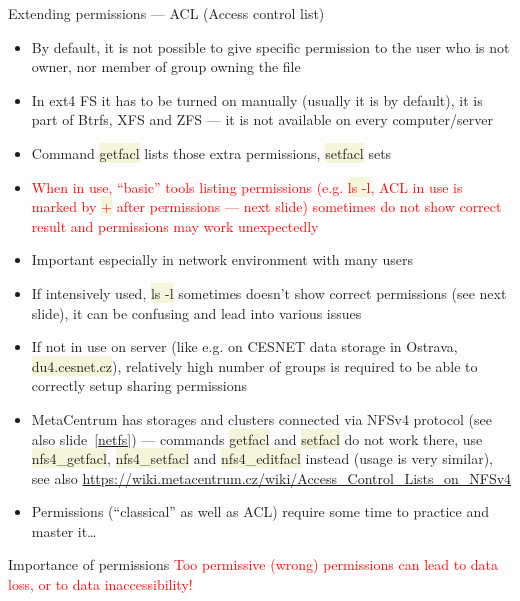 \documentclass[compress, xelatex, 11pt, xcolor=svgnames, aspectratio=169,
	hyperref={
		bookmarks=true,
		unicode=true,
		colorlinks=true,
		pdftitle={Linux, command line and MetaCentrum},
		plainpages=false,
		pdfauthor={Vojtech Zeisek},
		pdfsubject={Course about use of Linux command line, writing shell scripts and using MetaCentrum of CESNET},
		pdfcreator={XeLaTeX},
		pdfkeywords={Linux, GNU, BASH, shell, command line, MetaCentrum},
		linkcolor=DarkRed, %
		anchorcolor=DarkBlue, %
		citecolor=Indigo, %
		filecolor=NavyBlue, %
		menucolor=DarkMagenta, %
		urlcolor=DarkBlue, %
		},
	url={hyphens, lowtilde} %
	]{beamer}
\renewcommand{\texttt}[1]{\colorbox{Beige}{{\ttfamily #1}}}
\renewcommand{\alert}[1]{\textcolor{red}{#1}}
\begin{document}
\begin{frame}[allowframebreaks]{Extending permissions --- ACL (Access control list)}
	\label{acl}
	\begin{itemize}
		\item By default, it is not possible to give specific permission to the user who is not owner, nor member of group owning the file
		\item In ext4 FS it has to be turned on manually (usually it is by default), it is part of Btrfs, XFS and ZFS --- it is not available on every computer/server
		\item Command \texttt{getfacl} lists those extra permissions, \texttt{setfacl} sets
		\item \alert{When in use, \enquote{basic} tools listing permissions (e.g. \texttt{ls -l}, ACL in use is marked by \texttt{+} after permissions --- next slide) sometimes do not show correct result and permissions may work unexpectedly}
		\item Important especially in network environment with many users
		\item If intensively used, \texttt{ls -l} sometimes doesn't show correct permissions (see next slide), it can be confusing and lead into various issues
		\item If not in use on server (like e.g. on CESNET data storage in Ostrava, \texttt{du4.cesnet.cz}), relatively high number of groups is required to be able to correctly setup sharing permissions
		\item MetaCentrum has storages and clusters connected via NFSv4 protocol (see also slide~\ref{netfs}) --- commands \texttt{getfacl} and \texttt{setfacl} do not work there, use \texttt{nfs4\_getfacl}, \texttt{nfs4\_setfacl} and \texttt{nfs4\_editfacl} instead (usage is very similar), see also \url{https://wiki.metacentrum.cz/wiki/Access_Control_Lists_on_NFSv4}
		\item Permissions (\enquote{classical} as well as ACL) require some time to practice and master it\ldots
	\end{itemize}
	\begin{block}{Importance of permissions}
		\alert{Too permissive (wrong) permissions can lead to data loss, or to data inaccessibility!}
	\end{block}
\end{frame}
\end{document}
